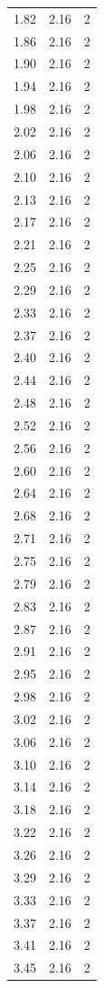 \begin{longtable}{lrr}
  1.82 & 2.16 & 2 \\
  1.86 & 2.16 & 2 \\
  1.90 & 2.16 & 2 \\
  1.94 & 2.16 & 2 \\
  1.98 & 2.16 & 2 \\
  2.02 & 2.16 & 2 \\
  2.06 & 2.16 & 2 \\
  2.10 & 2.16 & 2 \\
  2.13 & 2.16 & 2 \\
  2.17 & 2.16 & 2 \\
  2.21 & 2.16 & 2 \\
  2.25 & 2.16 & 2 \\
  2.29 & 2.16 & 2 \\
  2.33 & 2.16 & 2 \\
  2.37 & 2.16 & 2 \\
  2.40 & 2.16 & 2 \\
  2.44 & 2.16 & 2 \\
  2.48 & 2.16 & 2 \\
  2.52 & 2.16 & 2 \\
  2.56 & 2.16 & 2 \\
  2.60 & 2.16 & 2 \\
  2.64 & 2.16 & 2 \\
  2.68 & 2.16 & 2 \\
  2.71 & 2.16 & 2 \\
  2.75 & 2.16 & 2 \\
  2.79 & 2.16 & 2 \\
  2.83 & 2.16 & 2 \\
  2.87 & 2.16 & 2 \\
  2.91 & 2.16 & 2 \\
  2.95 & 2.16 & 2 \\
  2.98 & 2.16 & 2 \\
  3.02 & 2.16 & 2 \\
  3.06 & 2.16 & 2 \\
  3.10 & 2.16 & 2 \\
  3.14 & 2.16 & 2 \\
  3.18 & 2.16 & 2 \\
  3.22 & 2.16 & 2 \\
  3.26 & 2.16 & 2 \\
  3.29 & 2.16 & 2 \\
  3.33 & 2.16 & 2 \\
  3.37 & 2.16 & 2 \\
  3.41 & 2.16 & 2 \\
  3.45 & 2.16 & 2 \\

\end{longtable}
